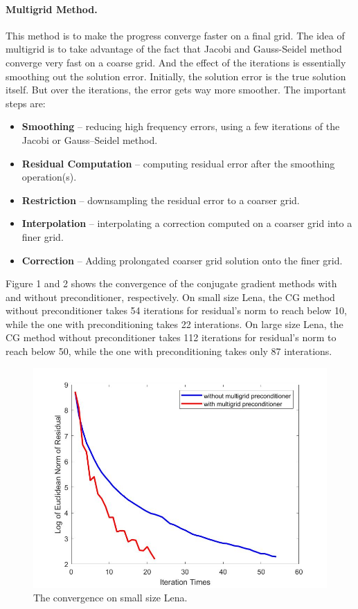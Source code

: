 \documentclass{article}
\begin{document}
\paragraph{Multigrid Method.} This method is to make the progress converge faster on a final grid. The idea of multigrid is to take advantage of the fact that Jacobi and Gauss-Seidel method converge very fast on a coarse grid. And the effect of the iterations is essentially smoothing out the solution error. Initially, the solution error is the true solution itself. But over the iterations, the error gets way more smoother. The important steps are:
\begin{itemize}
    \item \textbf{Smoothing} – reducing high frequency errors, using a few iterations of the Jacobi or Gauss–Seidel method.
    \item \textbf{Residual Computation} – computing residual error after the smoothing operation(s).
    \item \textbf{Restriction} – downsampling the residual error to a coarser grid.
    \item \textbf{Interpolation} – interpolating a correction computed on a coarser grid into a finer grid.
    \item \textbf{Correction} – Adding prolongated coarser grid solution onto the finer grid.
\end{itemize}
Figure 1 and 2 shows the convergence of the conjugate gradient methods with and without preconditioner, respectively. On small size Lena, the CG method without preconditioner takes 54 iterations for residual's norm to reach below 10, while the one with preconditioning takes 22 interations. On large size Lena, the CG method without preconditioner takes 112 iterations for residual's norm to reach below 50, while the one with preconditioning takes only 87 interations.
\begin{figure}[H]
   \centering
   \includegraphics[scale=0.3]{convergence_lena.jpg}
   \caption{The convergence on small size Lena.}
\end{figure}
\end{document}
